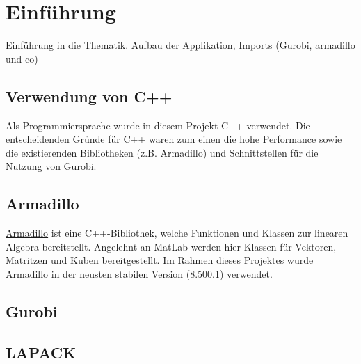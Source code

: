 \section{Einführung}
Einführung in die Thematik. Aufbau der Applikation, Imports (Gurobi, armadillo und co)
\subsection{Verwendung von C++}
Als Programmiersprache wurde in diesem Projekt C++ verwendet. Die entscheidenden Gründe für C++ waren zum einen die hohe Performance sowie die existierenden Bibliotheken (z.B. Armadillo) und Schnittstellen für die Nutzung von Gurobi.  
\subsection{Armadillo}
\href{http://arma.sourceforge.net/}{Armadillo} ist eine C++-Bibliothek, welche Funktionen und Klassen zur linearen Algebra bereitstellt. Angelehnt an MatLab werden hier Klassen für Vektoren, Matritzen und Kuben bereitgestellt.
Im Rahmen dieses Projektes wurde Armadillo in der neusten stabilen Version (8.500.1) verwendet. \\
\subsection{Gurobi}
\subsection{LAPACK}